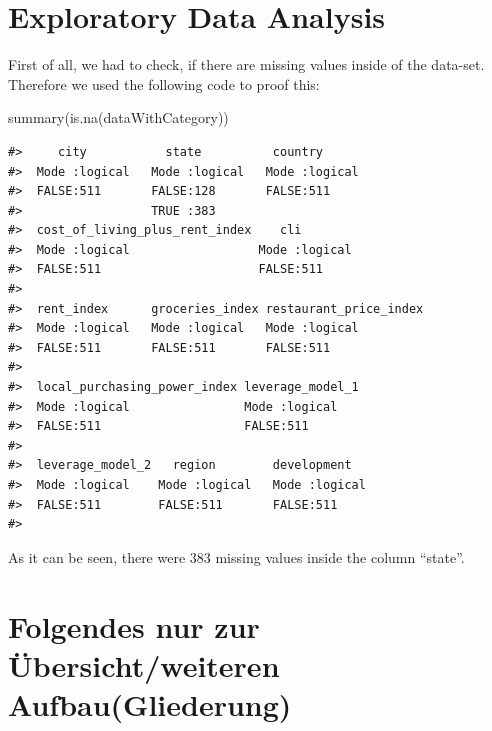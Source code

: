 \documentclass[
  11pt,
  a4paper,
  twoside]{scrbook}
\newenvironment{Shaded}{\begin{snugshade}}{\end{snugshade}}
\newcommand{\FunctionTok}[1]{\textcolor[rgb]{0.00,0.00,0.00}{#1}}
\newcommand{\NormalTok}[1]{#1}
\begin{document}
\hypertarget{exploratory-data-analysis}{%
\section{Exploratory Data Analysis}\label{exploratory-data-analysis}}

First of all, we had to check, if there are missing values inside of the data-set. Therefore we used the following code to proof this:

\linespread{1}

\begin{Shaded}
\begin{Highlighting}[]
\FunctionTok{summary}\NormalTok{(}\FunctionTok{is.na}\NormalTok{(dataWithCategory))}
\end{Highlighting}
\end{Shaded}

\linespread{1}

\begin{verbatim}
#>     city           state          country       
#>  Mode :logical   Mode :logical   Mode :logical  
#>  FALSE:511       FALSE:128       FALSE:511      
#>                  TRUE :383                      
#>  cost_of_living_plus_rent_index    cli         
#>  Mode :logical                  Mode :logical  
#>  FALSE:511                      FALSE:511      
#>                                                
#>  rent_index      groceries_index restaurant_price_index
#>  Mode :logical   Mode :logical   Mode :logical         
#>  FALSE:511       FALSE:511       FALSE:511             
#>                                                        
#>  local_purchasing_power_index leverage_model_1
#>  Mode :logical                Mode :logical   
#>  FALSE:511                    FALSE:511       
#>                                               
#>  leverage_model_2   region        development    
#>  Mode :logical    Mode :logical   Mode :logical  
#>  FALSE:511        FALSE:511       FALSE:511      
#> 
\end{verbatim}

As it can be seen, there were \(383\) missing values inside the column ``state''.

\hypertarget{folgendes-nur-zur-uxfcbersichtweiteren-aufbaugliederung}{%
\section{Folgendes nur zur Übersicht/weiteren Aufbau(Gliederung)}\label{folgendes-nur-zur-uxfcbersichtweiteren-aufbaugliederung}}
\end{document}
